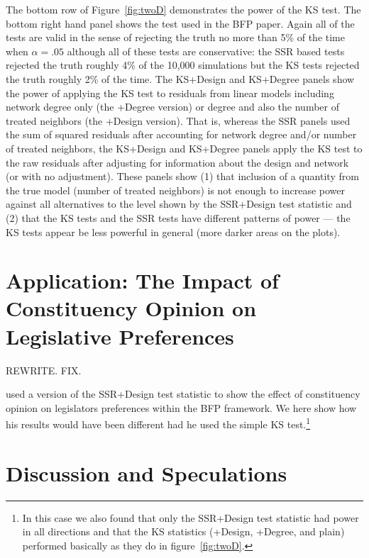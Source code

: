 The bottom row of Figure~\ref{fig:twoD} demonstrates the power of the KS test.
The bottom right hand panel shows the test used in the BFP paper. Again all of the tests
are valid in the sense of rejecting the truth no more than 5\% of the time
when $\alpha=.05$ although all of these tests are conservative: the SSR based
tests rejected the truth roughly 4\% of the 10,000 simulations but the KS
tests rejected the truth roughly 2\% of the time.  The KS+Design and KS+Degree
panels show the power of applying the KS test to residuals from linear models
including network degree only (the +Degree version) or degree and also the
number of treated neighbors (the +Design version). That is, whereas the SSR
panels used the sum of squared residuals after accounting for network degree
and/or number of treated neighbors, the KS+Design and KS+Degree panels apply
the KS test to the raw residuals after adjusting for information about the
design and network (or with no adjustment). These panels show (1) that
inclusion of a quantity from the true model (number of treated neighbors) is
not enough to increase power against all alternatives to the level shown by
the SSR+Design test statistic and (2) that the KS tests and the SSR tests have
different patterns of power --- the KS tests appear be less powerful in general
(more darker areas on the plots).

\section{Application: The Impact of Constituency Opinion on Legislative
  Preferences}

REWRITE. FIX. 

\citep{coppock2014information} used a version of the SSR+Design test statistic
to show the effect of constituency opinion on legislators preferences within
the BFP framework.  We here show how his results would have been different had
he used the simple KS test.\footnote{In this case we also found that only
  the SSR+Design test statistic had power in all directions and that the KS
  statistics (+Design, +Degree, and plain) performed basically as they do in
  figure~\ref{fig:twoD}.}


\section{Discussion and Speculations}

